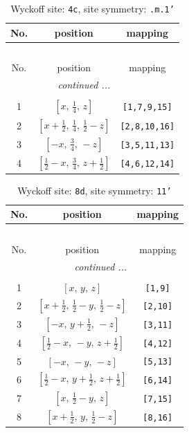 \documentclass[fleqn,8pt]{jsarticle}
\begin{document}
\renewcommand{\arraystretch}{1.2}
\begin{longtable}{ccc}
\caption{Wyckoff site: {\tt 4c}, site symmetry: {\tt .m.1'}}
 \\
 \hline \hline
No. & position & mapping \\ \hline \endfirsthead

\multicolumn{2}{l}{\tablename\ \thetable{}} \\
 \hline \hline
No. & position & mapping \\ \hline \endhead

 \hline \hline
\multicolumn{2}{r}{\footnotesize\it continued ...} \\ \endfoot

 \hline \hline
\multicolumn{2}{r}{} \\ \endlastfoot

1 & $\left[ x,\, \frac{1}{4},\, z \right]$ & {\tt [1,7,9,15]} \\ \hline
2 & $\left[ x + \frac{1}{2},\, \frac{1}{4},\, \frac{1}{2} - z \right]$ & {\tt [2,8,10,16]} \\ \hline
3 & $\left[ - x,\, \frac{3}{4},\, - z \right]$ & {\tt [3,5,11,13]} \\ \hline
4 & $\left[ \frac{1}{2} - x,\, \frac{3}{4},\, z + \frac{1}{2} \right]$ & {\tt [4,6,12,14]} \\
\end{longtable}
\renewcommand{\arraystretch}{1.2}
\begin{longtable}{ccc}
\caption{Wyckoff site: {\tt 8d}, site symmetry: {\tt 11'}}
 \\
 \hline \hline
No. & position & mapping \\ \hline \endfirsthead

\multicolumn{2}{l}{\tablename\ \thetable{}} \\
 \hline \hline
No. & position & mapping \\ \hline \endhead

 \hline \hline
\multicolumn{2}{r}{\footnotesize\it continued ...} \\ \endfoot

 \hline \hline
\multicolumn{2}{r}{} \\ \endlastfoot

1 & $\left[ x,\, y,\, z \right]$ & {\tt [1,9]} \\ \hline
2 & $\left[ x + \frac{1}{2},\, \frac{1}{2} - y,\, \frac{1}{2} - z \right]$ & {\tt [2,10]} \\ \hline
3 & $\left[ - x,\, y + \frac{1}{2},\, - z \right]$ & {\tt [3,11]} \\ \hline
4 & $\left[ \frac{1}{2} - x,\, - y,\, z + \frac{1}{2} \right]$ & {\tt [4,12]} \\ \hline
5 & $\left[ - x,\, - y,\, - z \right]$ & {\tt [5,13]} \\ \hline
6 & $\left[ \frac{1}{2} - x,\, y + \frac{1}{2},\, z + \frac{1}{2} \right]$ & {\tt [6,14]} \\ \hline
7 & $\left[ x,\, \frac{1}{2} - y,\, z \right]$ & {\tt [7,15]} \\ \hline
8 & $\left[ x + \frac{1}{2},\, y,\, \frac{1}{2} - z \right]$ & {\tt [8,16]} \\
\end{longtable}
\end{document}
